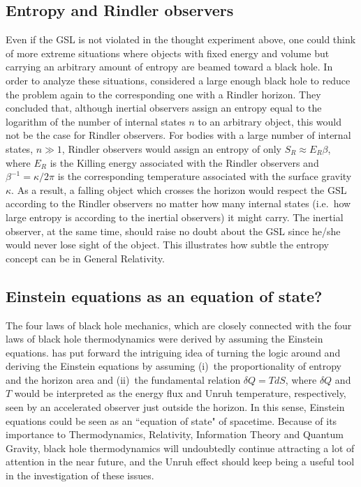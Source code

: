 \documentclass[12pt,nofootinbib,floatfix,aps,prd,showpacs,amsmath,amssymb,eqsecnum]{revtex4-2}
\begin{document}
\subsection{Entropy and Rindler observers}
\label{subsection:entropy2}

Even if the GSL is not violated in the thought experiment above, 
one could think of more extreme situations where objects with
fixed energy and volume but carrying an arbitrary amount of 
entropy are beamed toward a black hole. In order to analyze 
these situations, 
\textcite{Marolfetal04} considered a large 
enough black hole to reduce the problem again to the corresponding one 
with a Rindler horizon. They concluded that, although inertial 
observers assign an entropy equal to the logarithm of 
the number of internal states $n$ to an arbitrary object,
this would not be the case for Rindler observers. For bodies with 
a large number of internal states, $n \gg 1$, Rindler observers 
would assign an entropy  of only $S_R \approx E_R \beta$, 
where $E_R$ is the Killing energy associated with the Rindler 
observers  and $\beta^{-1} = \kappa/2 \pi$ is the corresponding 
temperature associated with the surface gravity $\kappa$. 
As a result, a falling object which crosses the horizon would 
respect the GSL according to the Rindler observers no matter how many 
internal states (i.e.~how large entropy is according
 to the inertial observers)
it might carry. The inertial observer, at the same time, should 
raise no doubt about the GSL since he/she would never lose 
sight of the object. This illustrates how subtle the entropy concept
can be in General Relativity.

\subsection{Einstein equations as an equation of state?}
\label{subsection:spacetimeentropy}

The four laws of black hole mechanics, which are closely connected
with the four laws of black hole thermodynamics were derived by assuming
the Einstein equations.  \textcite{Jacobson95} has put forward the 
intriguing idea of turning the logic around and deriving the Einstein 
equations by assuming  
(i)~the proportionality of entropy and the horizon area 
and
(ii)~the fundamental relation $\delta Q = T dS$,
where $\delta Q$ and $T$ would be interpreted as the energy flux
and Unruh temperature, respectively, seen by an accelerated observer 
just outside the horizon. In this sense, Einstein equations could 
be seen as an ``equation of state" of spacetime. 
Because of its importance to Thermodynamics, Relativity, Information 
Theory and Quantum Gravity, black hole thermodynamics will undoubtedly
continue 
attracting a lot of attention in the near future, and the Unruh effect 
should keep being a useful tool in the investigation of these issues.
\end{document}
